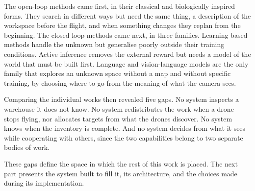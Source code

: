 The open-loop methods came first, in their classical and biologically inspired
forms. They search in different ways but need the same thing, a description of
the workspace before the flight, and when something changes they replan from the
beginning. The closed-loop methods came next, in three families. Learning-based
methods handle the unknown but generalise poorly outside their training
conditions. Active inference removes the external reward but needs a model of the
world that must be built first. Language and vision-language models are the only
family that explores an unknown space without a map and without specific
training, by choosing where to go from the meaning of what the camera sees.

Comparing the individual works then revealed five gaps. No system inspects a
warehouse it does not know. No system redistributes the work when a drone stops
flying, nor allocates targets from what the drones discover. No system knows when
the inventory is complete. And no system decides from what it sees while
cooperating with others, since the two capabilities belong to two separate bodies
of work.

These gaps define the space in which the rest of this work is placed. The next
part presents the system built to fill it, its architecture, and the choices made
during its implementation.
